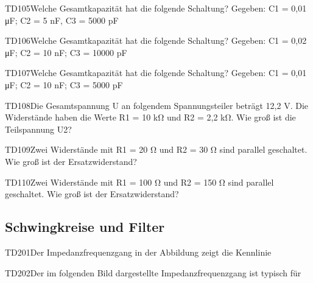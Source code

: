 \begin{question}{TD105}{Welche Gesamtkapazität hat die folgende Schaltung? Gegeben: C1 = 0,01 μF;  C2 = 5 nF,  C3 = 5000 pF}
\end{question}

\begin{question}{TD106}{Welche Gesamtkapazität hat die folgende Schaltung? Gegeben: C1 = 0,02 μF; C2 = 10 nF; C3 = 10000 pF}
\end{question}

\begin{question}{TD107}{Welche Gesamtkapazität hat die folgende Schaltung? Gegeben: C1 = 0,01 μF; C2 = 10 nF; C3 = 5000 pF}
\end{question}

\begin{question}{TD108}{Die Gesamtspannung U an folgendem Spannungsteiler beträgt 12,2 V. Die Widerstände haben die Werte R1 = 10 kΩ und R2 = 2,2 kΩ. Wie groß ist die Teilspannung U2?}
\end{question}

\begin{question}{TD109}{Zwei Widerstände mit R1 = 20 Ω und R2 = 30 Ω sind parallel geschaltet. Wie groß ist der Ersatzwiderstand?}
\end{question}

\begin{question}{TD110}{Zwei Widerstände mit R1 = 100 Ω und R2 = 150 Ω sind parallel geschaltet. Wie groß ist der Ersatzwiderstand?}
\end{question}

\subsection{Schwingkreise und Filter}

\begin{question}{TD201}{Der Impedanzfrequenzgang in der Abbildung zeigt die Kennlinie}
\end{question}

\begin{question}{TD202}{Der im folgenden Bild dargestellte Impedanzfrequenzgang ist typisch für}
\end{question}

